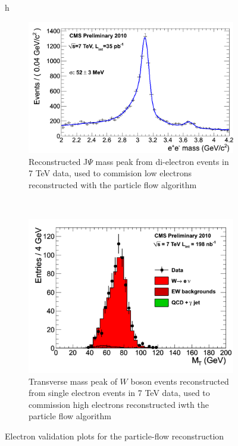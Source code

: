\begin{figure}{h}
    \centering
    \begin{subfigure}[h]{0.40\textwidth}
        \includegraphics[width=\textwidth]{Figures/Reconstruction_Diagrams/ELE__jpsi_tk_35invpb.png}
        \caption{Reconstructed J$\Psi$ mass peak from di-electron events
          in 7 TeV data, used to commision low \PT electrons reconstructed
        with the particle flow algorithm}\label{fig:ele_jpsi_mass}
      \end{subfigure}
      ~ %
    \begin{subfigure}[h]{0.40\textwidth}
        \includegraphics[width=\textwidth]{Figures/Reconstruction_Diagrams/ELE__Welenu_7TeV.pdf}
        \caption{Transverse mass peak of $W$ boson events
          reconstructed from single electron events in 7 TeV data, used to
        commission high \PT electrons reconstructed iwth the particle flow
      algorithm}\label{fig:ele_w_mass}
      \end{subfigure}
      \caption{Electron validation plots for the particle-flow reconstruction}\label{fig:ele_pf_validation}
\end{figure}

